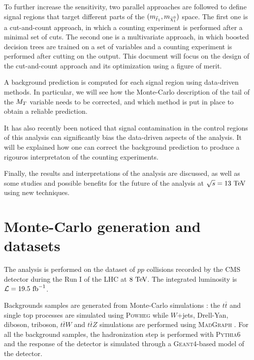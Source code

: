     To further increase the sensitivity, two parallel approaches are followed to define
    signal regions that target different parts of the $(m_{\tilde{t}_1},m_{\tilde{\chi}_1^0})$
    space. The first one is a cut-and-count approach, in which a counting experiment is performed 
    after a minimal set of cuts. The second one is a multivariate approach, in which boosted 
    decision trees are trained on a set of variables and a counting experiment is performed 
    after cutting on the output. This document will focus on the design of the cut-and-count
    approach and its optimization using a figure of merit.

    A background prediction is computed for each signal region using data-driven methods.
    In particular, we will see how the Monte-Carlo description of the tail of the $M_T$ 
    variable needs to be corrected, and which method is put in place to obtain a reliable 
    prediction.

    It has also recently been noticed that signal contamination in the control regions of
    this analysis can significantly bias the data-driven aspects of the analysis. It will
    be explained how one can correct the background prediction to produce a rigouros
    interpretaton of the counting experiments.

    Finally, the results and interpretations of the analysis are discussed, as well as 
    some studies and possible benefits for the future of the analysis at $\sqrt{s}=13~\text{TeV}$
    using new techniques.

    \section{Monte-Carlo generation and datasets}
    
    The analysis is performed on the dataset of $pp$ collisions recorded by the CMS detector
    during the Run I of the LHC at $8~\text{TeV}$. The integrated luminosity is $\mathcal{L} =
    19.5~\text{fb}^{-1}$.

    Backgrounds samples are generated from Monte-Carlo simulations : the $t\bar{t}$ and 
    single top processes are simulated using \textsc{Powheg} \cite{Powheg} while $W$+jets,
    Drell-Yan, diboson, triboson, $t\bar{t}W$ and $t\bar{t}Z$ simulations are performed 
    using \textsc{MadGraph} \cite{Madgraph}. For all the background samples, the 
    hadronization step is performed with \textsc{Pythia}6 \cite{Pythia} and the response of
    the detector is simulated through a \textsc{Geant4}-based model of the detector.
    
